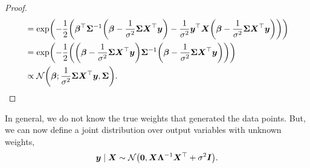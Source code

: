 \begin{proof}
\begin{align*}
                                             & = \exp \lft( -\frac{1}{2} \lft( \transpose{\vec{\beta}} \inv{\mat{\Sigma}} \lft( \vec{\beta} - \frac{1}{\sigma^2} \mat{\Sigma} \transpose{\mat{X}} \vec{y} \rgt) - \frac{1}{\sigma^2} \transpose{\vec{y}} \mat{X} \lft( \vec{\beta} - \frac{1}{\sigma^2} \mat{\Sigma} \transpose{\mat{X}} \vec{y} \rgt) \rgt) \rgt) \\
                                             & = \exp \lft( -\frac{1}{2} \lft( \lft( \vec{\beta} - \frac{1}{\sigma^2} \mat{\Sigma} \transpose{\mat{X}} \vec{y} \rgt) \inv{\mat{\Sigma}} \lft( \vec{\beta} - \frac{1}{\sigma^2} \mat{\Sigma} \transpose{\mat{X}} \vec{y} \rgt) \rgt) \rgt)                                                                          \\
                                             & \propto \mathcal{N} \lft( \vec{\beta}; \frac{1}{\sigma^2} \mat{\Sigma} \transpose{\mat{X}} \vec{y}, \mat{\Sigma} \rgt).
    \end{align*}
\end{proof}

In general, we do not know the true weights that generated the data points. But, we can now define
a joint distribution over output variables with unknown weights, \[
    \vec{y} \mid \mat{X} \sim \mathcal{N}\lft( \vec{0}, \mat{X} \inv{\mat{\Lambda}} \transpose{\mat{X}} + \sigma^2 \mat{I} \rgt).
\]

